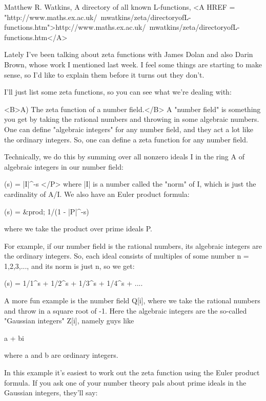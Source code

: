 Matthew R. Watkins, A directory of all known L-functions,
<A HREF = "http://www.maths.ex.ac.uk/~mwatkins/zeta/directoryofL-functions.htm">http://www.maths.ex.ac.uk/~mwatkins/zeta/directoryofL-functions.htm</A>

Lately I've been talking about zeta functions with James Dolan and also 
Darin Brown, whose work I mentioned last week.  I feel some things are 
starting to make sense, so I'd like to explain them before it turns out 
they don't.

I'll just list some zeta functions, so you can see what we're dealing with:

<B>A) The zeta function of a number field.</B>  A "number field" is something you 
get by taking the rational numbers and throwing in some algebraic numbers.   
One can define "algebraic integers" for any number field, and they act a lot 
like the ordinary integers.   So, one can define a zeta function for any 
number field.  

Technically, we do this by summing over all nonzero ideals I in the
ring A of algebraic integers in our number field:

\zeta (s) = \sum |I|^{-s}
</P>
where |I| is a number called the "norm" of I, which is 
just the cardinality of A/I.  We also have an Euler product formula:

\zeta (s) = &prod; 1/(1 - |P|^{-s})

where we take the product over prime ideals P.

For example, if our number field is the rational numbers, its algebraic 
integers are the ordinary integers.  So, each ideal consists of multiples 
of some number n = 1,2,3,..., and its norm is just n, so we get:

\zeta (s) = 1/1^{s} + 1/2^{s} + 1/3^{s} + 1/4^{s} + ....

A more fun example is the number field Q[i], where we take the
rational numbers and throw in a square root of -1.  Here the
algebraic integers are the so-called "Gaussian integers" Z[i], 
namely guys like

a + bi 

where a and b are ordinary integers.  

In this example it's easiest to work out the zeta function using 
the Euler product formula.  If you ask one of your number theory 
pals about prime ideals in the Gaussian integers, they'll say:

